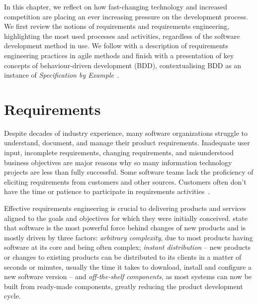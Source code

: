 \documentclass[dissertation,final]{softeng}
\begin{document}
In this chapter, we reflect on how fast-changing technology and increased competition are placing an ever increasing pressure on the development process. We first review the notions of requirements and requirements engineering, highlighting the most used processes and activities, regardless of the software development method in use. We follow with a description of requirements engineering practices in agile methods and finish with a presentation of key concepts of behaviour-driven development (BDD), contextualising BDD as an instance of \emph{Specification by Example}~\citep{Adzic201106}.

\section{Requirements}
\label{sec:requirements}
Despite decades of industry experience, many software organizations struggle to understand, document, and manage their product requirements. Inadequate user input, incomplete requirements, changing requirements, and misunderstood business objectives are major reasons why so many information technology projects are less than fully successful. Some software teams lack the proficiency of eliciting requirements from customers and other sources. Customers often don't have the time or patience to participate in requirements activities~\citep{Wiegers2013}. 

Effective requirements engineering is crucial to delivering products and services aligned to the goals and objectives for which they were initially conceived. \citet{Hull2011} state that software is the most powerful force behind changes of new products and is mostly driven by three factors: \emph{arbitrary complexity}, due to most products having software at its core and being often complex; \emph{instant distribution} -- new products or changes to existing products can be distributed to its clients in a matter of seconds or minutes, usually the time it takes to download, install and configure a new software version -- and \emph{off-the-shelf components}, as most systems can now be built from ready-made components, greatly reducing the product development cycle.
\end{document}

